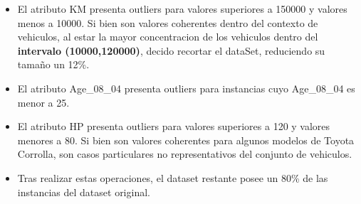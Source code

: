 \documentclass[]{article}
\newenvironment{Shaded}{\begin{snugshade}}{\end{snugshade}}
\newcommand{\DecValTok}[1]{\textcolor[rgb]{0.00,0.00,0.81}{#1}}
\newcommand{\KeywordTok}[1]{\textcolor[rgb]{0.13,0.29,0.53}{\textbf{#1}}}
\newcommand{\NormalTok}[1]{#1}
\newcommand{\OperatorTok}[1]{\textcolor[rgb]{0.81,0.36,0.00}{\textbf{#1}}}
\newcommand{\StringTok}[1]{\textcolor[rgb]{0.31,0.60,0.02}{#1}}
\providecommand{\tightlist}{%
  \setlength{\itemsep}{0pt}\setlength{\parskip}{0pt}}
\begin{document}
\begin{Shaded}
\end{Shaded}

\begin{itemize}
\tightlist
\item
  El atributo KM presenta outliers para valores superiores a 150000 y
  valores menos a 10000. Si bien son valores coherentes dentro del
  contexto de vehiculos, al estar la mayor concentracion de los
  vehiculos dentro del \textbf{intervalo (10000,120000)}, decido
  recortar el dataSet, reduciendo su tamaño un 12\%.
\end{itemize}

\begin{Shaded}
\end{Shaded}

\begin{itemize}
\tightlist
\item
  El atributo Age\_08\_04 presenta outliers para instancias cuyo
  Age\_08\_04 es menor a 25.\\
\item
  El atributo HP presenta outliers para valores superiores a 120 y
  valores menores a 80. Si bien son valores coherentes para algunos
  modelos de Toyota Corrolla, son casos particulares no representativos
  del conjunto de vehiculos.\\
\item
  Tras realizar estas operaciones, el dataset restante posee un 80\% de
  las instancias del dataset original.
\end{itemize}
\end{document}
